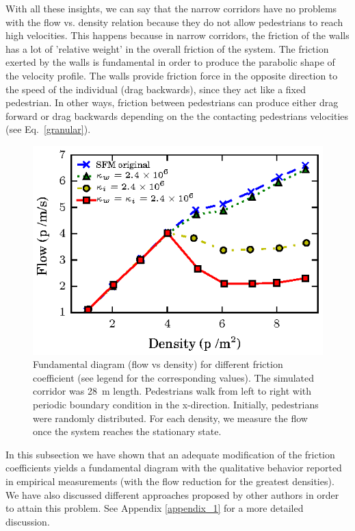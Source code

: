 With all these insights, we can say that the narrow corridors have no problems with the flow vs. density relation because they do not allow pedestrians to reach high velocities. This happens because in narrow corridors, the friction of the walls has a lot of 'relative weight' in the overall friction of the system. 
The friction exerted by the walls is fundamental in order to produce the parabolic shape of the velocity profile. The walls provide friction force in the opposite direction to the speed of the individual (drag backwards), since they act like a fixed pedestrian. In other ways, friction between pedestrians can produce either drag forward or drag backwards depending on the the contacting pedestrians velocities (see Eq.~\ref{granular}).\\


\begin{figure}[htbp!]
\includegraphics[width=\columnwidth]
{plots/flow-density_pasillo22m_fgmodified_multi.eps}
\caption{\label{fgmodified-w22} Fundamental diagram (flow vs density) for different friction coefficient (see legend for the corresponding values). The simulated corridor was 28~m length. Pedestrians walk from left to right with periodic boundary condition in the x-direction. Initially, pedestrians were randomly distributed. For each density, we measure the flow once the system reaches the stationary state.}
\end{figure}

In this subsection we have shown that an adequate modification of the friction coefficients yields a fundamental diagram with the qualitative behavior reported in empirical measurements (with the flow reduction for the greatest densities). We have also discussed different approaches proposed by other authors in order to attain this problem. See Appendix \ref{appendix_1} for a more detailed discussion.\\

